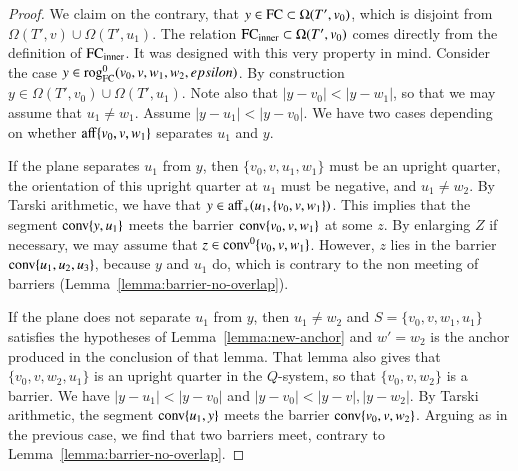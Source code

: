 \begin{proof}
We claim on the contrary, that $y\in {\operatorname{FC}}\subset \Omega(T',v_0)$, which is disjoint
from $\Omega(T',v)\cup\Omega(T',u_1)$.
The relation ${\operatorname{FC}}_{\text{inner}}\subset\Omega(T',v_0)$ comes directly from the
definition of ${\operatorname{FC}}_{\text{inner}}$.  It was designed with this very property in mind.
Consider the case $y\in{\operatorname{rog}}^0_{\text{FC}}(v_0,v,w_1,w_2,epsilon)$.  By construction
$y\in \Omega(T',v_0)\cup\Omega(T',u_1)$.  Note also that $|y-v_0|<|y-w_1|$,
so that we may assume that $u_1\ne w_1$.  Assume $|y-u_1|<|y-v_0|$.
We have two cases depending on whether ${\operatorname{aff}}\{v_0,v,w_1\}$ separates
$u_1$ and $y$.  

If the plane separates $u_1$ from $y$, then
$\{v_0,v,u_1,w_1\}$ must be an upright quarter, the orientation of this
upright quarter at $u_1$ must be negative, and $u_1\ne w_2$.
By Tarski arithmetic,
we have that $y\in{\operatorname{aff}}_+(u_1,\{v_0,v,w_1\})$.  This implies that
the segment ${\operatorname{conv}}\{y,u_1\}$ meets the barrier ${\operatorname{conv}}\{v_0,v,w_1\}$
at some $z$.  By enlarging $Z$ if necessary, we may assume that 
$z\in{\operatorname{conv}}^0\{v_0,v,w_1\}$.
However, $z$ lies in the barrier ${\operatorname{conv}}\{u_1,u_2,u_3\}$, because
$y$ and $u_1$ do,
which is contrary to the non meeting of barriers (Lemma~\ref{lemma:barrier-no-overlap}).

If the plane does not separate $u_1$ from $y$, then $u_1\ne w_2$ and 
$S = \{v_0,v,w_1,u_1\}$ satisfies the hypotheses of Lemma~\ref{lemma:new-anchor} and $w'=w_2$ is the anchor produced in the conclusion of that lemma.
That lemma also gives that $\{v_0,v,w_2,u_1\}$ is an upright quarter in
the $Q$-system, so that $\{v_0,v,w_2\}$ is a barrier.
We have $|y-u_1|<|y-v_0|$ and $|y-v_0|<|y-v|,|y-w_2|$.
By Tarski arithmetic, the segment ${\operatorname{conv}}\{u_1,y\}$
meets the barrier ${\operatorname{conv}}\{v_0,v,w_2\}$.  Arguing as in the previous
case, we find that two barriers meet, contrary to Lemma~\ref{lemma:barrier-no-overlap}.
%
%
\end{proof}

